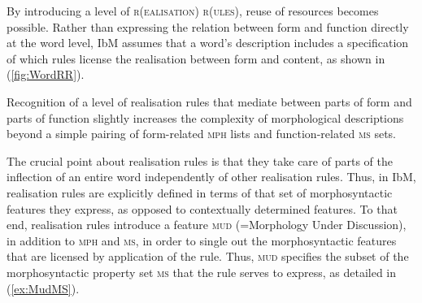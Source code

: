 \documentclass[output=paper
	        ,collection
	        ,collectionchapter
 	        ,biblatex
                ,babelshorthands
                ,newtxmath
                ,draftmode
                ,colorlinks, citecolor=brown
]{langscibook}
\begin{document}
{By  introducing a level of \textsc{r(ealisation) r(ules)}, reuse
of resources becomes possible. Rather than expressing the relation
between form and function directly at the word level, IbM assumes that
a word's description includes a specification of which rules license
the realisation between form and content, as shown in 
(\ref{fig:WordRR}).


\begin{exe}

     

\label{fig:WordRR}
\end{exe}

Recognition of a level of realisation rules that mediate between parts
of form and parts of function slightly increases the complexity of
morphological descriptions beyond a simple pairing of form-related
\textsc{mph} lists and function-related \textsc{ms} sets. 

The crucial point about realisation rules is that they take care of
parts of the inflection of an entire word independently of other
realisation rules. Thus, in IbM, realisation rules are explicitly
defined in terms of that set of morphosyntactic features they express,
as opposed to contextually determined features. To that end, realisation
rules introduce a feature \textsc{mud} (=Morphology Under Discussion),
in addition to \textsc{mph} and \textsc{ms}, in order to single out
the morphosyntactic features that are licensed by application of the
rule. Thus, \textsc{mud} specifies the subset of the morphosyntactic
property set \textsc{ms} that the rule serves to express, as detailed
in (\ref{ex:MudMS}). 

}
\end{document}
